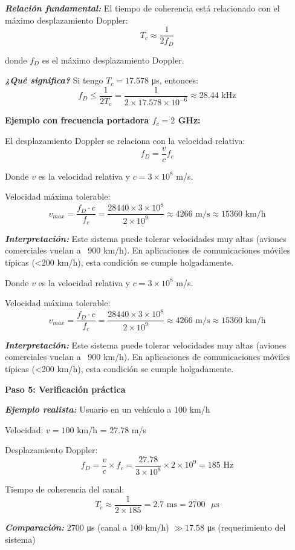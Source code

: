 \documentclass[11pt,a4paper]{article}
\begin{document}
\textit{\textbf{Relaci\'on fundamental:}} El tiempo de coherencia est\'a relacionado con el m\'aximo desplazamiento Doppler:
\[
T_c \approx \frac{1}{2f_D}
\]

donde $f_D$ es el m\'aximo desplazamiento Doppler.

\textit{\textbf{¿Qu\'e significa?}} Si tengo $T_c = 17.578$ μs, entonces:
\[
f_D \leq \frac{1}{2T_c} = \frac{1}{2 \times 17.578 \times 10^{-6}} \approx 28.44 \text{ kHz}
\]

\textbf{Ejemplo con frecuencia portadora $f_c = 2$ GHz:}

El desplazamiento Doppler se relaciona con la velocidad relativa:
\[
f_D = \frac{v}{c} f_c
\]

Donde $v$ es la velocidad relativa y $c = 3 \times 10^8$ m/s.

Velocidad m\'axima tolerable:
\[
v_{max} = \frac{f_D \cdot c}{f_c} = \frac{28440 \times 3 \times 10^8}{2 \times 10^9} \approx 4266 \text{ m/s} \approx 15360 \text{ km/h}
\]

\textit{\textbf{Interpretaci\'on:}} Este sistema puede tolerar velocidades muy altas (aviones comerciales vuelan a ~900 km/h). En aplicaciones de comunicaciones m\'oviles t\'ipicas (<200 km/h), esta condici\'on se cumple holgadamente.

Donde $v$ es la velocidad relativa y $c = 3 \times 10^8$ m/s.

Velocidad m\'axima tolerable:
\[
v_{max} = \frac{f_D \cdot c}{f_c} = \frac{28440 \times 3 \times 10^8}{2 \times 10^9} \approx 4266 \text{ m/s} \approx 15360 \text{ km/h}
\]

\textit{\textbf{Interpretaci\'on:}} Este sistema puede tolerar velocidades muy altas (aviones comerciales vuelan a ~900 km/h). En aplicaciones de comunicaciones m\'oviles t\'ipicas (<200 km/h), esta condici\'on se cumple holgadamente.

\textbf{Paso 5: Verificaci\'on pr\'actica}

\textit{\textbf{Ejemplo realista:}} Usuario en un veh\'iculo a 100 km/h

Velocidad: $v = 100$ km/h = 27.78 m/s

Desplazamiento Doppler:
\[
f_D = \frac{v}{c} \times f_c = \frac{27.78}{3 \times 10^8} \times 2 \times 10^9 = 185 \text{ Hz}
\]

Tiempo de coherencia del canal:
\[
T_c \approx \frac{1}{2 \times 185} = 2.7 \text{ ms} = 2700 \text{ }\mu\text{s}
\]

\textit{\textbf{Comparaci\'on:}} $2700$ μs (canal a 100 km/h) $\gg 17.58$ μs (requerimiento del sistema)
\end{document}
